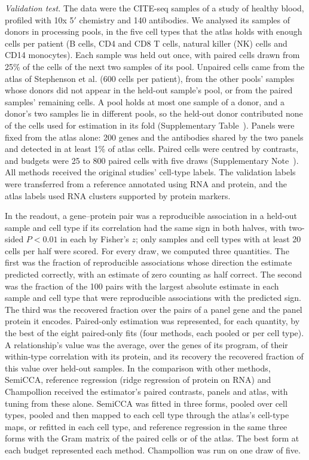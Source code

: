 \documentclass[pdflatex,sn-vancouver-num,iicol]{sn-jnl}
\begin{document}
\textit{Validation test.} The data were the CITE-seq samples of a study of healthy blood\cite{babdor2026}, profiled with 10x 5$'$ chemistry and 140 antibodies. We analysed its \VlNFolds{} samples of \VlNDonors{} donors in \VlNPools{} processing pools, in the five cell types that the atlas holds with enough cells per patient (B cells, CD4 and CD8 T cells, natural killer (NK) cells and CD14 monocytes). Each sample was held out once, with paired cells drawn from 25\% of the cells of the next two samples of its pool. Unpaired cells came from the atlas of Stephenson et al.\cite{stephenson2021} (600 cells per patient), from the other pools' samples whose donors did not appear in the held-out sample's pool, or from the paired samples' remaining cells. A pool holds at most one sample of a donor, and a donor's two samples lie in different pools, so the held-out donor contributed none of the cells used for estimation in its fold (Supplementary Table~). Panels were fixed from the atlas alone: 200 genes and the \VlNAntibodies{} antibodies shared by the two panels and detected in at least 1\% of atlas cells. Paired cells were centred by contrasts, and budgets were 25 to 800 paired cells with five draws (Supplementary Note~). All methods received the original studies' cell-type labels. The validation labels were transferred from a reference annotated using RNA and protein, and the atlas labels used RNA clusters supported by protein markers\cite{babdor2026,stephenson2021}.

In the readout, a gene--protein pair was a reproducible association in a held-out sample and cell type if its correlation had the same sign in both halves, with two-sided $P<0.01$ in each by Fisher's $z$; only samples and cell types with at least 20 cells per half were scored. For every draw, we computed three quantities. The first was the fraction of reproducible associations whose direction the estimate predicted correctly, with an estimate of zero counting as half correct. The second was the fraction of the 100 pairs with the largest absolute estimate in each sample and cell type that were reproducible associations with the predicted sign. The third was the recovered fraction over the \BoNCognate{} pairs of a panel gene and the panel protein it encodes. Paired-only estimation was represented, for each quantity, by the best of the eight paired-only fits (four methods, each pooled or per cell type). A relationship's value was the average, over the genes of its program, of their within-type correlation with its protein, and its recovery the recovered fraction of this value over held-out samples. In the comparison with other methods, SemiCCA, reference regression (ridge regression of protein on RNA) and Champollion received the estimator's paired contrasts, panels and atlas, with tuning from these alone. SemiCCA was fitted in three forms, pooled over cell types, pooled and then mapped to each cell type through the atlas's cell-type maps, or refitted in each cell type, and reference regression in the same three forms with the Gram matrix of the paired cells or of the atlas. The best form at each budget represented each method. Champollion was run on one draw of five.
\end{document}
